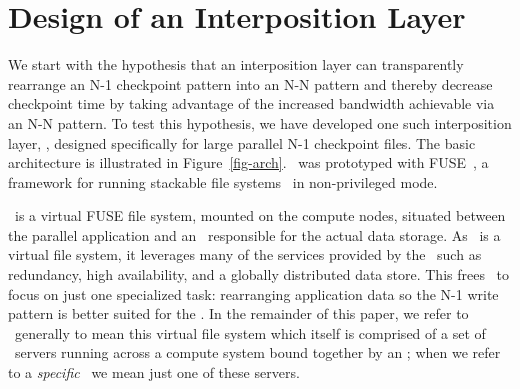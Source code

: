 \section{Design of an Interposition Layer}
\label{arch}



We start with the hypothesis that an interposition layer can transparently
rearrange an N-1 checkpoint pattern into an N-N pattern and thereby decrease
checkpoint time by taking advantage of the increased bandwidth achievable via
an N-N pattern. To test this hypothesis, we have developed one such
interposition layer, \plfs, designed specifically for large parallel N-1
checkpoint files. The basic architecture is illustrated in
Figure~\ref{fig-arch}. \plfs\ was prototyped with FUSE~\cite{fuse}, a 
framework for running stackable file systems~\cite{usenix00fist} in 
non-privileged mode.


\plfs\ is a virtual FUSE file system, mounted on the compute nodes, situated between the parallel application and
an \upfs\ responsible for the actual data storage. 
As \plfs\ is a virtual file
system, it leverages many of the services provided by the \upfs\ such as
redundancy, high availability, and a globally distributed data store.  This
frees \plfs\ to focus on just one specialized task: rearranging application
data so the N-1 write pattern is better suited for the \upfs.  In the remainder
of this paper,  we refer to \plfs\ generally to mean this virtual file system
which itself is comprised of a set of \plfs\ servers running across a compute
system bound together by an \upfs; when we refer to a {\em specific} \plfs\ we
mean just one of these servers.





